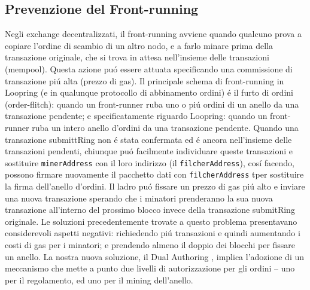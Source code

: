 \documentclass[UTF8,nofonts]{article}
\begin{document}
\begin{multicols}{2}
\subsection{Prevenzione del Front-running\label{sec:dual_authoring}}
Negli exchange decentralizzati, il front-running avviene quando qualcuno prova a copiare l'ordine di scambio di un altro nodo, e a farlo minare prima della transazione originale, che si trova in attesa nell'insieme delle transazioni (mempool). Questa azione pu\'o essere attuata specificando una commissione di transazione pi\'u alta (prezzo di gas). Il principale schema di front-running in Loopring (e in qualunque protocollo di abbinamento ordini) \'e il furto di ordini (order-flitch): quando un front-runner ruba uno o pi\'u ordini di un anello da una transazione pendente; e specificatamente riguardo Loopring: quando un front-runner ruba un intero anello d'ordini da una transazione pendente.
Quando una transazione submittRing non \'e stata confermata ed \'e ancora nell'insieme delle transazioni pendenti, chiunque pu\'o facilmente individuare queste transazioni e sostituire \verb|minerAddress| con il loro  indirizzo (il \verb|filcherAddress|), cos\'i facendo, possono firmare nuovamente il pacchetto dati con \verb|filcherAddress| tper sostituire la firma dell'anello d'ordini. Il ladro pu\'o fissare un prezzo di gas pi\'u alto e inviare una nuova transazione sperando che i minatori prenderanno la sua nuova transazione all'interno del prossimo blocco invece della transazione submitRing originale.
Le soluzioni precedentemente trovate a questo problema presentavano considerevoli aspetti negativi: richiedendo pi\'u transazioni e quindi aumentando i costi di gas per i minatori;  e prendendo almeno il doppio dei blocchi per fissare un anello. La nostra nuova soluzione, il Dual Authoring \cite{dualauthor}, implica l'adozione di un meccanismo che mette a punto due livelli di autorizzazione per gli ordini – uno per il regolamento, ed uno per il mining dell'anello.


\end{multicols}
\end{document}
